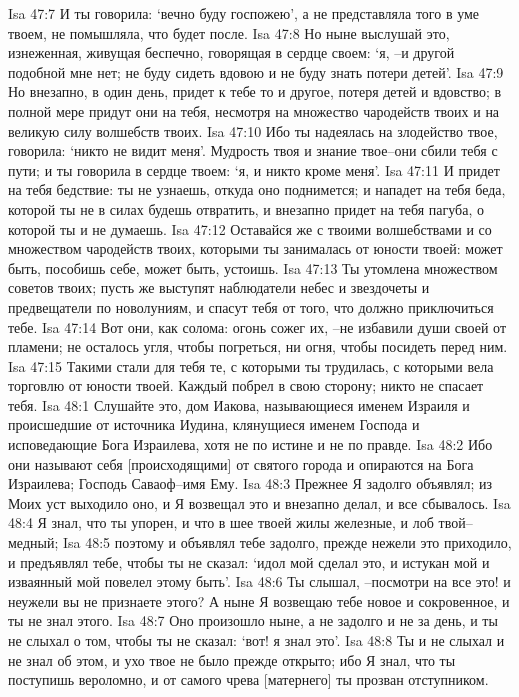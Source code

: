Isa 47:7  И ты говорила: `вечно буду госпожею', а не представляла того в уме твоем, не помышляла, что будет после.
Isa 47:8  Но ныне выслушай это, изнеженная, живущая беспечно, говорящая в сердце своем: `я, --и другой подобной мне нет; не буду сидеть вдовою и не буду знать потери детей'.
Isa 47:9  Но внезапно, в один день, придет к тебе то и другое, потеря детей и вдовство; в полной мере придут они на тебя, несмотря на множество чародейств твоих и на великую силу волшебств твоих.
Isa 47:10  Ибо ты надеялась на злодейство твое, говорила: `никто не видит меня'. Мудрость твоя и знание твое--они сбили тебя с пути; и ты говорила в сердце твоем: `я, и никто кроме меня'.
Isa 47:11  И придет на тебя бедствие: ты не узнаешь, откуда оно поднимется; и нападет на тебя беда, которой ты не в силах будешь отвратить, и внезапно придет на тебя пагуба, о которой ты и не думаешь.
Isa 47:12  Оставайся же с твоими волшебствами и со множеством чародейств твоих, которыми ты занималась от юности твоей: может быть, пособишь себе, может быть, устоишь.
Isa 47:13  Ты утомлена множеством советов твоих; пусть же выступят наблюдатели небес и звездочеты и предвещатели по новолуниям, и спасут тебя от того, что должно приключиться тебе.
Isa 47:14  Вот они, как солома: огонь сожег их, --не избавили души своей от пламени; не осталось угля, чтобы погреться, ни огня, чтобы посидеть перед ним.
Isa 47:15  Такими стали для тебя те, с которыми ты трудилась, с которыми вела торговлю от юности твоей. Каждый побрел в свою сторону; никто не спасает тебя.
Isa 48:1  Слушайте это, дом Иакова, называющиеся именем Израиля и происшедшие от источника Иудина, клянущиеся именем Господа и исповедающие Бога Израилева, хотя не по истине и не по правде.
Isa 48:2  Ибо они называют себя [происходящими] от святого города и опираются на Бога Израилева; Господь Саваоф--имя Ему.
Isa 48:3  Прежнее Я задолго объявлял; из Моих уст выходило оно, и Я возвещал это и внезапно делал, и все сбывалось.
Isa 48:4  Я знал, что ты упорен, и что в шее твоей жилы железные, и лоб твой--медный;
Isa 48:5  поэтому и объявлял тебе задолго, прежде нежели это приходило, и предъявлял тебе, чтобы ты не сказал: `идол мой сделал это, и истукан мой и изваянный мой повелел этому быть'.
Isa 48:6  Ты слышал, --посмотри на все это! и неужели вы не признаете этого? А ныне Я возвещаю тебе новое и сокровенное, и ты не знал этого.
Isa 48:7  Оно произошло ныне, а не задолго и не за день, и ты не слыхал о том, чтобы ты не сказал: `вот! я знал это'.
Isa 48:8  Ты и не слыхал и не знал об этом, и ухо твое не было прежде открыто; ибо Я знал, что ты поступишь вероломно, и от самого чрева [матернего] ты прозван отступником.
